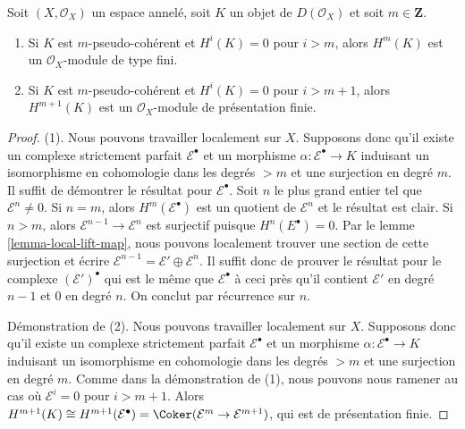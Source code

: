 {\begin{lemma}

\label{lemma-finite-cohomology}

Soit $(X, \mathcal{O}_X)$ un espace annelé, soit $K$ un objet de $D(\mathcal{O}_X)$ et soit $m \in \mathbf{Z}$.

\begin{enumerate}

\item Si $K$ est $m$-pseudo-cohérent et $H^i(K) = 0$
pour $i > m$, alors $H^m(K)$ est un $\mathcal{O}_X$-module de type fini.
\item Si $K$ est $m$-pseudo-cohérent et $H^i(K) = 0$
pour $i > m + 1$, alors $H^{m + 1}(K)$ est un
$\mathcal{O}_X$-module de présentation finie.

\end{enumerate}

\end{lemma}

\begin{proof}

(1). Nous pouvons travailler localement sur $X$. Supposons donc qu'il existe un complexe strictement parfait $\mathcal{E}^\bullet$ et un morphisme
$\alpha : \mathcal{E}^\bullet \to K$ induisant un isomorphisme en cohomologie dans les degrés $> m$ et une surjection en degré $m$. Il suffit de démontrer le résultat pour $\mathcal{E}^\bullet$. Soit $n$ le plus grand entier tel que $\mathcal{E}^n \not = 0$. Si $n = m$, alors $H^m(\mathcal{E}^\bullet)$ est un quotient de
$\mathcal{E}^n$ et le résultat est clair. Si $n > m$, alors $\mathcal{E}^{n - 1} \to \mathcal{E}^n$ est surjectif puisque
$H^n(E^\bullet) = 0$. Par le lemme \ref{lemma-local-lift-map},
nous pouvons localement trouver une section de cette surjection et écrire
$\mathcal{E}^{n - 1} = \mathcal{E}' \oplus \mathcal{E}^n$. Il suffit donc de prouver le résultat pour le complexe
$(\mathcal{E}')^\bullet$ qui est le même que $\mathcal{E}^\bullet$
à ceci près qu'il contient $\mathcal{E}'$ en degré $n - 1$ et $0$ en degré $n$. On conclut par récurrence sur $n$.

\medskip\noindent
Démonstration de (2). Nous pouvons travailler localement sur $X$. Supposons donc qu'il existe un complexe strictement parfait $\mathcal{E}^\bullet$ et un morphisme $\alpha : \mathcal{E}^\bullet \to K$ induisant un isomorphisme en cohomologie dans les degrés $> m$ et une surjection en degré $m$. Comme dans la démonstration de (1), nous pouvons nous ramener au cas où $\mathcal{E}^i = 0$ pour $i > m + 1$. Alors $H^{m + 1}(K) \cong H^{m + 1}(\mathcal{E}^\bullet) =
\Coker(\mathcal{E}^m \to \mathcal{E}^{m + 1})$, qui est de présentation finie.
\end{proof}

}
